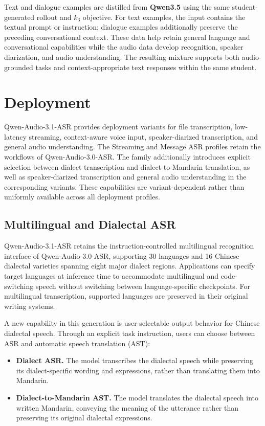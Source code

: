 \documentclass{article}
\begin{document}
Text and dialogue examples are distilled from \textbf{Qwen3.5} using the same student-generated rollout and $k_3$ objective. For text examples, the input contains the textual prompt or instruction; dialogue examples additionally preserve the preceding conversational context. These data help retain general language and conversational capabilities while the audio data develop recognition, speaker diarization, and audio understanding. The resulting mixture supports both audio-grounded tasks and context-appropriate text responses within the same student.

\section{Deployment}
\label{sec:deployment}
Qwen-Audio-3.1-ASR provides deployment variants for file transcription, low-latency streaming, context-aware voice input, speaker-diarized transcription, and general audio understanding. The Streaming and Message ASR profiles retain the workflows of Qwen-Audio-3.0-ASR. The family additionally introduces explicit selection between dialect transcription and dialect-to-Mandarin translation, as well as speaker-diarized transcription and general audio understanding in the corresponding variants. These capabilities are variant-dependent rather than uniformly available across all deployment profiles.

\subsection{Multilingual and Dialectal ASR}
\label{subsec:multilinguality}

Qwen-Audio-3.1-ASR retains the instruction-controlled multilingual recognition interface of Qwen-Audio-3.0-ASR, supporting 30 languages and 16 Chinese dialectal varieties spanning eight major dialect regions. Applications can specify target languages at inference time to accommodate multilingual and code-switching speech without switching between language-specific checkpoints. For multilingual transcription, supported languages are preserved in their original writing systems.

A new capability in this generation is user-selectable output behavior for Chinese dialectal speech. Through an explicit task instruction, users can choose between ASR and automatic speech translation (AST):

\begin{itemize}[leftmargin=*,noitemsep]
    \item \textbf{Dialect ASR.} The model transcribes the dialectal speech while preserving its dialect-specific wording and expressions, rather than translating them into Mandarin.
    \item \textbf{Dialect-to-Mandarin AST.} The model translates the dialectal speech into written Mandarin, conveying the meaning of the utterance rather than preserving its original dialectal expressions.
\end{itemize}
\end{document}
